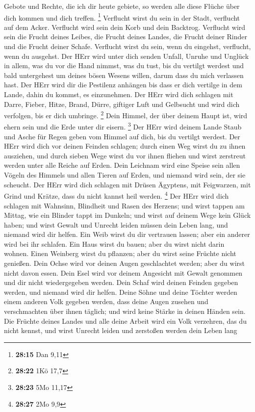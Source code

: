 Gebote und Rechte, die ich dir heute gebiete, so werden alle diese
Flüche über dich kommen und dich treffen. \footnote{\textbf{28:15} Dan
  9,11}  Verflucht wirst du sein in der Stadt, verflucht
auf dem Acker.  Verflucht wird sein dein Korb und dein
Backtrog.  Verflucht wird sein die Frucht deines Leibes,
die Frucht deines Landes, die Frucht deiner Rinder und die Frucht deiner
Schafe.  Verflucht wirst du sein, wenn du eingehst,
verflucht, wenn du ausgehst.  Der HErr wird unter dich
senden Unfall, Unruhe und Unglück in allem, was du vor die Hand nimmst,
was du tust, bis du vertilgt werdest und bald untergehest um deines
bösen Wesens willen, darum dass du mich verlassen hast. 
Der HErr wird dir die Pestilenz anhängen bis dass er dich vertilge in
dem Lande, dahin du kommst, es einzunehmen.  Der HErr
wird dich schlagen mit Darre, Fieber, Hitze, Brand, Dürre, giftiger Luft
und Gelbsucht und wird dich verfolgen, bis er dich umbringe. \footnote{\textbf{28:22}
  1Kö 17,7}  Dein Himmel, der über deinem Haupt ist, wird
ehern sein und die Erde unter dir eisern. \footnote{\textbf{28:23} 5Mo
  11,17}  Der HErr wird deinem Lande Staub und Asche für
Regen geben vom Himmel auf dich, bis du vertilgt werdest.
 Der HErr wird dich vor deinen Feinden schlagen; durch
einen Weg wirst du zu ihnen ausziehen, und durch sieben Wege wirst du
vor ihnen fliehen und wirst zerstreut werden unter alle Reiche auf
Erden.  Dein Leichnam wird eine Speise sein allen Vögeln
des Himmels und allen Tieren auf Erden, und niemand wird sein, der sie
scheucht.  Der HErr wird dich schlagen mit Drüsen
Ägyptens, mit Feigwarzen, mit Grind und Krätze, dass du nicht kannst
heil werden. \footnote{\textbf{28:27} 2Mo 9,9}  Der HErr
wird dich schlagen mit Wahnsinn, Blindheit und Rasen des Herzens;
 und wirst tappen am Mittag, wie ein Blinder tappt im
Dunkeln; und wirst auf deinem Wege kein Glück haben; und wirst Gewalt
und Unrecht leiden müssen dein Leben lang, und niemand wird dir helfen.
 Ein Weib wirst du dir vertrauen lassen; aber ein anderer
wird bei ihr schlafen. Ein Haus wirst du bauen; aber du wirst nicht
darin wohnen. Einen Weinberg wirst du pflanzen; aber du wirst seine
Früchte nicht genießen.  Dein Ochse wird vor deinen Augen
geschlachtet werden; aber du wirst nicht davon essen. Dein Esel wird vor
deinem Angesicht mit Gewalt genommen und dir nicht wiedergegeben werden.
Dein Schaf wird deinen Feinden gegeben werden, und niemand wird dir
helfen.  Deine Söhne und deine Töchter werden einem
anderen Volk gegeben werden, dass deine Augen zusehen und verschmachten
über ihnen täglich; und wird keine Stärke in deinen Händen sein.
 Die Früchte deines Landes und alle deine Arbeit wird ein
Volk verzehren, das du nicht kennst, und wirst Unrecht leiden und
zerstoßen werden dein Leben lang

